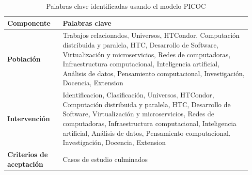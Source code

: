 \begin{table}[htbp]
	\centering
	\caption{Palabras clave identificadas usando el modelo PICOC}
	\label{table:picoc_keywords}
	\begin{tabular}{p{1.8cm}p{5.7cm}}
		\toprule
		\textbf{Componente}              & \textbf{Palabras clave}                                                                                                                                                                                                                                                                                                                                                                                                                                                                                                                      \\
		\midrule
		\textbf{Población}               & Trabajos relacionados, Universos, HTCondor, Computación distribuida y paralela, HTC, Desarrollo de Software, Virtualización y microservicios, Redes de computadoras, Infraestructura computacional, Inteligencia artificial, Análisis de datos, Pensamiento computacional, Investigación, Docencia, Extension                                                                                                                                                                                                                                \\
		\addlinespace[0.3em]
		\textbf{Intervención}            & Identificacion, Clasificación, Universos, HTCondor, Computación distribuida y paralela, HTC, Desarrollo de Software, Virtualización y microservicios, Redes de computadoras, Infraestructura computacional, Inteligencia artificial, Análisis de datos, Pensamiento computacional, Investigación, Docencia, Extension                                                                                                                                                                                                                        \\
		\addlinespace[0.3em]
		\textbf{Criterios de aceptación} & Casos de estudio culminados                                                                                                                                                                                                                                                                                                                                                                                                                                                                                                                  \\

\end{tabular}
\end{table}
